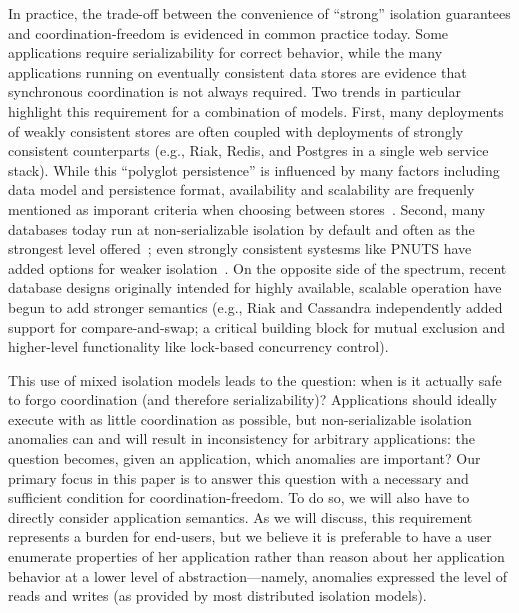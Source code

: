 
 In practice, the
trade-off between the convenience of ``strong'' isolation guarantees
and coordination-freedom is evidenced in common practice today. Some
applications require serializability for correct behavior, while the
many applications running on eventually consistent data stores are
evidence that synchronous coordination is not always required. Two
trends in particular highlight this requirement for a combination of
models. First, many deployments of weakly consistent stores are often
coupled with deployments of strongly consistent counterparts (e.g.,
Riak, Redis, and Postgres in a single web service stack). While this
``polyglot persistence'' is influenced by many factors including data
model and persistence format, availability and scalability are
frequenly mentioned as imporant criteria when choosing between
stores~\cite{polyglot}. Second, many databases today run at
non-serializable isolation by default and often as the strongest level
offered~\cite{hat-vldb}; even strongly consistent systesms like PNUTS
have added options for weaker isolation~\cite{pnuts-update}. On the
opposite side of the spectrum, recent database designs originally
intended for highly available, scalable operation have begun to add
stronger semantics (e.g., Riak and Cassandra independently added
support for compare-and-swap; a critical building block for mutual
exclusion and higher-level functionality like lock-based concurrency
control).

This use of mixed isolation models leads to the question: when is it
actually safe to forgo coordination (and therefore serializability)?
Applications should ideally execute with as little coordination as
possible, but non-serializable isolation anomalies can and will result
in inconsistency for arbitrary applications: the question becomes,
given an application, which anomalies are important? Our primary focus
in this paper is to answer this question with a necessary and
sufficient condition for coordination-freedom. To do so, we will also
have to directly consider application semantics. As we will discuss,
this requirement represents a burden for end-users, but we believe it
is preferable to have a user enumerate properties of her application
rather than reason about her application behavior at a lower level of
abstraction---namely, anomalies expressed the level of reads and
writes (as provided by most distributed isolation models).

